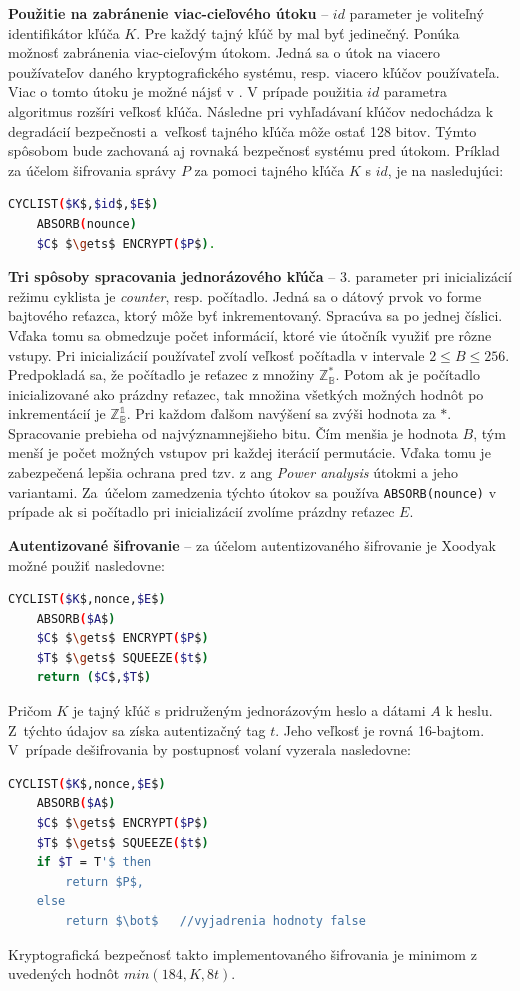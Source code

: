 \textbf{Použitie na zabránenie viac-cieľového útoku} -- $id$ parameter je voliteľný identifikátor kľúča $K$. Pre každý tajný kľúč by mal byť jedinečný. Ponúka možnosť zabránenia viac-cieľovým útokom. Jedná sa o útok na viacero používateľov daného kryptografického systému, resp. viacero kľúčov používateľa. Viac o tomto útoku je možné nájsť v \cite{mta}. V prípade použitia $id$ parametra algoritmus rozšíri veľkosť kľúča. Následne pri vyhľadávaní kľúčov nedochádza k degradácií bezpečnosti a~veľkosť tajného kľúča môže ostať 128 bitov. Týmto spôsobom bude zachovaná aj rovnaká bezpečnosť systému pred útokom. 
Príklad za účelom šifrovania správy $P$ za pomoci tajného kľúča $K$ s $id$, je na nasledujúci:
\begin{lstlisting}[language=bash, mathescape=true]
	CYCLIST($K$,$id$,$E$)
	ABSORB(nounce)
	$C$ $\gets$ ENCRYPT($P$).
\end{lstlisting}
\textbf{Tri spôsoby spracovania jednorázového kľúča} -- 3. parameter pri inicializácií režimu cyklista je \textit{counter}, resp. počítadlo. Jedná sa o dátový prvok vo forme bajtového reťazca, ktorý môže byť inkrementovaný. Spracúva sa po jednej číslici. Vďaka tomu sa obmedzuje počet informácií, ktoré vie útočník využiť pre rôzne vstupy. Pri inicializácií používateľ zvolí veľkosť počítadla v intervale $2 \leq B \leq 256$. Predpokladá sa, že počítadlo je reťazec z množiny $\mathbb{Z^*_B}$. Potom ak je počítadlo inicializované ako prázdny reťazec, tak množina všetkých možných hodnôt po inkrementácií je $\mathbb{Z^1_B}$. Pri každom ďalšom navýšení sa zvýši hodnota za $*$. Spracovanie prebieha od najvýznamnejšieho bitu. Čím menšia je hodnota $B$, tým menší je počet možných vstupov pri každej iterácií permutácie. Vďaka tomu je zabezpečená lepšia ochrana pred tzv. z ang \textit{Power analysis} \cite{paa} útokmi a jeho variantami. Za~účelom zamedzenia týchto útokov sa používa \lstinline|ABSORB(nounce)| v prípade ak si počítadlo pri inicializácií zvolíme prázdny reťazec $E$. 

\textbf{Autentizované šifrovanie} -- za účelom autentizovaného šifrovanie je Xoodyak možné použiť nasledovne:
\begin{lstlisting}[language=bash,mathescape=true]
	CYCLIST($K$,nonce,$E$)
	ABSORB($A$)
	$C$ $\gets$ ENCRYPT($P$)
	$T$ $\gets$ SQUEEZE($t$)
	return ($C$,$T$)
\end{lstlisting}
Pričom $K$ je tajný kľúč s pridruženým jednorázovým heslo a dátami $A$ k heslu. Z~týchto údajov sa získa autentizačný tag $t$. Jeho veľkosť je rovná 16-bajtom. V~prípade dešifrovania by postupnosť volaní vyzerala nasledovne: \\  
\begin{lstlisting}[language=bash,mathescape=true]
	CYCLIST($K$,nonce,$E$)
	ABSORB($A$)
	$C$ $\gets$ ENCRYPT($P$)
	$T$ $\gets$ SQUEEZE($t$)
	if $T = T'$ then 
		return $P$, 
	else 
		return $\bot$ 	//vyjadrenia hodnoty false 
\end{lstlisting}
Kryptografická bezpečnosť takto implementovaného šifrovania je minimom z uvedených hodnôt $min(184,K,8t)$.

